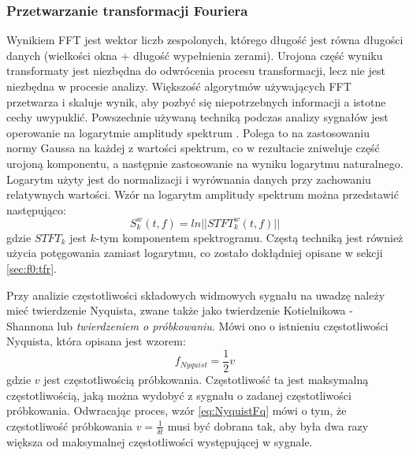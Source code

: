 \documentclass[12pt,a4paper,twoside]{mwart}
\begin{document}
\subsubsection{Przetwarzanie transformacji Fouriera}\label{sec:przetwarzanieFFT}
Wynikiem FFT jest wektor liczb zespolonych, którego długość jest równa długości danych (wielkości okna + długość wypełnienia zerami). Urojona część wyniku transformaty jest niezbędna do odwrócenia procesu transformacji, lecz nie jest niezbędna w procesie analizy. Większość algorytmów używających FFT przetwarza i skaluje wynik, aby pozbyć się niepotrzebnych informacji a istotne cechy uwypuklić. Powszechnie używaną techniką podczas analizy sygnałów jest operowanie na logarytmie amplitudy spektrum \cite[501-507]{Transcription:Talkin:RAPT}. Polega to na zastosowaniu normy Gaussa na każdej z wartości spektrum, co w rezultacie zniweluje część urojoną komponentu, a następnie zastosowanie na wyniku logarytmu naturalnego. Logarytm użyty jest do normalizacji i wyrównania danych przy zachowaniu relatywnych wartości. Wzór na logarytm amplitudy spektrum można przedstawić następująco:
\begin{equation}\label{eq:logPowSpec}
S_k^w(t,f) = ln||STFT_k^w(t,f)||
\end{equation}
gdzie $STFT_k$ jest $k$-tym komponentem spektrogramu. Częstą techniką jest również użycia potęgowania zamiast logarytmu, co zostało dokłądniej opisane w sekcji \ref{sec:f0:tfr}.

Przy analizie częstotliwości składowych widmowych sygnału na uwadzę należy mieć twierdzenie Nyquista, zwane także jako twierdzenie Kotielnikowa - Shannona lub \textit{twierdzeniem o próbkowaniu}. Mówi ono o istnieniu częstotliwości Nyquista, która opisana jest wzorem:
\begin{equation} \label{eq:NyquistFq}
  f_{Nyquist} = \frac{1}{2}v
\end{equation}
gdzie $v$ jest częstotliwością próbkowania. Częstotliwość ta jest maksymalną częstotliwością, jaką można wydobyć z sygnału o zadanej częstotliwości próbkowania. Odwracając proces, wzór \ref{eq:NyquistFq} mówi o tym, że częstotliwość próbkowania $v = \frac{1}{\delta t}$ musi być dobrana tak, aby była dwa razy większa od maksymalnej częstotliwości występującej w sygnale.
\end{document}

